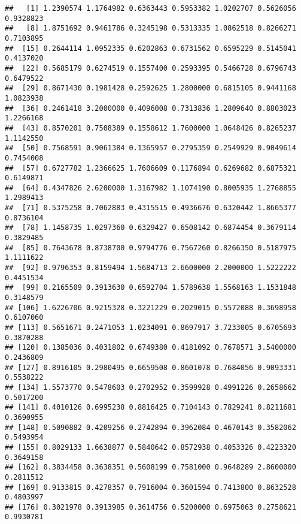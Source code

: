 \documentclass[
]{article}
\newenvironment{Shaded}{\begin{snugshade}}{\end{snugshade}}
\newcommand{\DataTypeTok}[1]{\textcolor[rgb]{0.13,0.29,0.53}{#1}}
\newcommand{\DecValTok}[1]{\textcolor[rgb]{0.00,0.00,0.81}{#1}}
\newcommand{\KeywordTok}[1]{\textcolor[rgb]{0.13,0.29,0.53}{\textbf{#1}}}
\newcommand{\NormalTok}[1]{#1}
\newcommand{\OperatorTok}[1]{\textcolor[rgb]{0.81,0.36,0.00}{\textbf{#1}}}
\newcommand{\StringTok}[1]{\textcolor[rgb]{0.31,0.60,0.02}{#1}}
\begin{document}
\begin{Shaded}
\end{Shaded}

\begin{verbatim}
##   [1] 1.2390574 1.1764982 0.6363443 0.5953382 1.0202707 0.5626056 0.9328823
##   [8] 1.8751692 0.9461786 0.3245198 0.5313335 1.0862518 0.8266271 0.7103895
##  [15] 0.2644114 1.0952335 0.6202863 0.6731562 0.6595229 0.5145041 0.4137020
##  [22] 0.5685179 0.6274519 0.1557400 0.2593395 0.5466728 0.6796743 0.6479522
##  [29] 0.8671430 0.1981428 0.2592625 1.2800000 0.6815105 0.9441168 1.0823938
##  [36] 0.2461418 3.2000000 0.4096008 0.7313836 1.2809640 0.8803023 1.2266168
##  [43] 0.8570201 0.7508389 0.1558612 1.7600000 1.0648426 0.8265237 1.1142550
##  [50] 0.7568591 0.9061384 0.1365957 0.2795359 0.2549929 0.9049614 0.7454008
##  [57] 0.6727782 1.2366625 1.7606609 0.1176894 0.6269682 0.6875321 0.6149871
##  [64] 0.4347826 2.6200000 1.3167982 1.1074190 0.8005935 1.2768855 1.2989413
##  [71] 0.5375258 0.7062883 0.4315515 0.4936676 0.6320442 1.8665377 0.8736104
##  [78] 1.1458735 1.0297360 0.6329427 0.6508142 0.6874454 0.3679114 0.3829485
##  [85] 0.7643678 0.8738700 0.9794776 0.7567260 0.8266350 0.5187975 1.1111622
##  [92] 0.9796353 0.8159494 1.5684713 2.6600000 2.2000000 1.5222222 0.4451534
##  [99] 0.2165509 0.3913630 0.6592704 1.5789638 1.5568163 1.1531848 0.3148579
## [106] 1.6226706 0.9215328 0.3221229 0.2029015 0.5572088 0.3698958 0.6107060
## [113] 0.5651671 0.2471053 1.0234091 0.8697917 3.7233005 0.6705693 0.3870288
## [120] 0.1385036 0.4031802 0.6749380 0.4181092 0.7678571 3.5400000 0.2436809
## [127] 0.8916105 0.2980495 0.6659508 0.8601078 0.7684056 0.9093331 0.5538222
## [134] 1.5573770 0.5478603 0.2702952 0.3599928 0.4991226 0.2658662 0.5017200
## [141] 0.4010126 0.6995238 0.8816425 0.7104143 0.7829241 0.8211681 0.3690955
## [148] 0.5090882 0.4209256 0.2742894 0.3962084 0.4670143 0.3582062 0.5493954
## [155] 0.8029133 1.6638877 0.5840642 0.8572938 0.4053326 0.4223320 0.3649158
## [162] 0.3834458 0.3638351 0.5608199 0.7581000 0.9648289 2.8600000 0.2811512
## [169] 0.9133815 0.4278357 0.7916004 0.3601594 0.7413800 0.8632528 0.4803997
## [176] 0.3021978 0.3913985 0.3614756 0.5200000 0.6975063 0.2758621 0.9930781

\end{verbatim}
\end{document}

